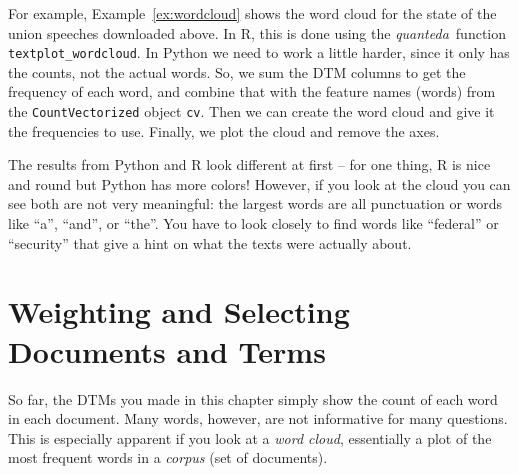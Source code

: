 For example, Example~\ref{ex:wordcloud} shows the word cloud for the state of the union speeches downloaded above.
In R, this is done using the \emph{quanteda}\ function \texttt{textplot\_wordcloud}.
In Python we need to work a little harder, since it only has the counts, not the actual words.
So, we sum the DTM columns to get the frequency of each word, and combine that with the feature names (words)
from the \verb|CountVectorized| object \verb|cv|. Then we can create the word cloud and give it the frequencies to use.
Finally, we plot the cloud and remove the axes.


The results from Python and R look different at first -- for one thing, R is nice and round but Python has more colors!
However, if you look at the cloud you can see both are not very meaningful: the largest words are all punctuation or words like
``a'', ``and'', or ``the''.
You have to look closely to find words like ``federal'' or ``security'' that give a hint on what the texts were actually about.



%

\section{Weighting and Selecting Documents and Terms}
\label{sec:dtmselect}

So far, the DTMs you made in this chapter simply show the count of each word in each document.
Many words, however, are not informative for many questions.
This is especially apparent if you look at a \emph{word cloud},
essentially a plot of the most frequent words in a  \emph{corpus} (set of documents).

